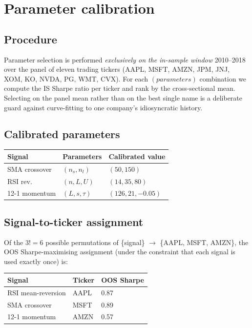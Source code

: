\documentclass[11pt,a4paper]{article}
\begin{document}
\section{Parameter calibration}

\subsection{Procedure}

Parameter selection is performed \emph{exclusively on the in-sample window}
2010--2018 over the panel of eleven trading tickers (AAPL, MSFT, AMZN, JPM,
JNJ, XOM, KO, NVDA, PG, WMT, CVX). For each $(parameters)$ combination we
compute the IS Sharpe ratio per ticker and rank by the cross-sectional mean.
Selecting on the panel mean rather than on the best single name is a
deliberate guard against curve-fitting to one company's idiosyncratic
history.

\subsection{Calibrated parameters}

\begin{center}
\begin{tabular}{@{}lll@{}}
\toprule
Signal & Parameters & Calibrated value \\
\midrule
SMA crossover & $(n_s, n_l)$ & $(50, 150)$ \\
RSI rev.\     & $(n, L, U)$  & $(14, 35, 80)$ \\
12-1 momentum & $(L, s, \tau)$ & $(126, 21, -0.05)$ \\
\bottomrule
\end{tabular}
\end{center}

\subsection{Signal-to-ticker assignment}

Of the $3! = 6$ possible permutations of \{signal\} $\to$ \{AAPL, MSFT, AMZN\},
the OOS Sharpe-maximising assignment (under the constraint that each signal is
used exactly once) is:
\begin{center}
\begin{tabular}{@{}lll@{}}
\toprule
Signal & Ticker & OOS Sharpe \\
\midrule
RSI mean-reversion & AAPL & 0.87 \\
SMA crossover      & MSFT & 0.89 \\
12-1 momentum      & AMZN & 0.57 \\
\bottomrule
\end{tabular}
\end{center}
\end{document}
